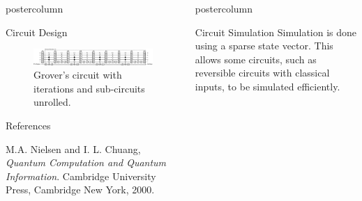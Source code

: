\documentclass[final]{beamer} %
\begin{document}
\begin{frame}{}
\begin{columns}
\begin{column}{.33\textwidth}
\begin{beamercolorbox}[center,wd=\textwidth]{postercolumn}
\begin{minipage}[c][0.95\textheight][s]{0.95\columnwidth}
\begin{block}{\large Circuit Design}
		        \begin{figure}[!htbp]
		            \centering
		            \includegraphics[width=\textwidth]{figures/Grover_Unrolled.eps}
		            \caption{Grover's circuit with iterations and sub-circuits unrolled.}
		        \end{figure}
            \end{block}
            \vfill
            \begin{block}{\large References}
		    \begin{thebibliography}{9}
                \small{
  		            M.A. Nielsen and I. L. Chuang,
  		            \emph{Quantum Computation and Quantum Information}.
  		            Cambridge University Press,
		            Cambridge New York,
  		            2000.
                }
		    \end{thebibliography}
            \end{block}
            \vfill
        \end{minipage}
        \end{beamercolorbox}
        \end{column}

        \begin{column}{.33\textwidth}
        \begin{beamercolorbox}[center,wd=\textwidth]{postercolumn}
        \begin{minipage}[c][0.95\textheight][s]{0.95\columnwidth}
            \begin{block}{\large Circuit Simulation}
                Simulation is done using a sparse state vector.
                This allows some circuits,
                such as reversible circuits with classical inputs,
                to be simulated efficiently.


\end{block}
\end{minipage}
\end{beamercolorbox}
\end{column}
\end{columns}
\end{frame}
\end{document}
